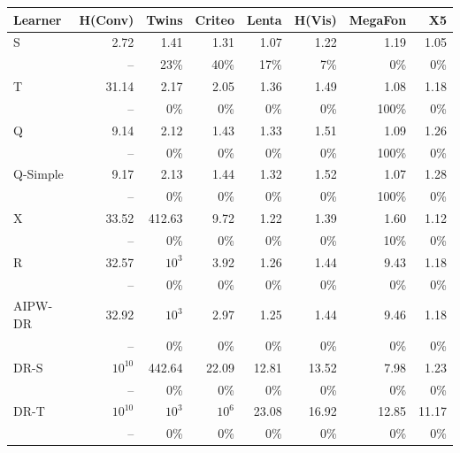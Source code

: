 \begin{tabular}{l|rrrrrrr}
\hline
Learner & H(Conv) & Twins & Criteo & Lenta & H(Vis) & MegaFon & X5 \\
\hline
S & 2.72 & 1.41 & 1.31 & 1.07 & 1.22 & 1.19 & 1.05 \\
 & \scriptsize -- & \scriptsize 23\% & \scriptsize 40\% & \scriptsize 17\% & \scriptsize 7\% & \scriptsize 0\% & \scriptsize 0\% \\[2pt]
T & 31.14 & 2.17 & 2.05 & 1.36 & 1.49 & 1.08 & 1.18 \\
 & \scriptsize -- & \scriptsize 0\% & \scriptsize 0\% & \scriptsize 0\% & \scriptsize 0\% & \scriptsize 100\% & \scriptsize 0\% \\[2pt]
\hline
Q & 9.14 & 2.12 & 1.43 & 1.33 & 1.51 & 1.09 & 1.26 \\
 & \scriptsize -- & \scriptsize 0\% & \scriptsize 0\% & \scriptsize 0\% & \scriptsize 0\% & \scriptsize 100\% & \scriptsize 0\% \\[2pt]
Q-Simple & 9.17 & 2.13 & 1.44 & 1.32 & 1.52 & 1.07 & 1.28 \\
 & \scriptsize -- & \scriptsize 0\% & \scriptsize 0\% & \scriptsize 0\% & \scriptsize 0\% & \scriptsize 100\% & \scriptsize 0\% \\[2pt]
\hline
X & 33.52 & 412.63 & 9.72 & 1.22 & 1.39 & 1.60 & 1.12 \\
 & \scriptsize -- & \scriptsize 0\% & \scriptsize 0\% & \scriptsize 0\% & \scriptsize 0\% & \scriptsize 10\% & \scriptsize 0\% \\[2pt]
R & 32.57 & $10^{3}$ & 3.92 & 1.26 & 1.44 & 9.43 & 1.18 \\
 & \scriptsize -- & \scriptsize 0\% & \scriptsize 0\% & \scriptsize 0\% & \scriptsize 0\% & \scriptsize 0\% & \scriptsize 0\% \\[2pt]
AIPW-DR & 32.92 & $10^{3}$ & 2.97 & 1.25 & 1.44 & 9.46 & 1.18 \\
 & \scriptsize -- & \scriptsize 0\% & \scriptsize 0\% & \scriptsize 0\% & \scriptsize 0\% & \scriptsize 0\% & \scriptsize 0\% \\[2pt]
\hline
DR-S & $10^{10}$ & 442.64 & 22.09 & 12.81 & 13.52 & 7.98 & 1.23 \\
 & \scriptsize -- & \scriptsize 0\% & \scriptsize 0\% & \scriptsize 0\% & \scriptsize 0\% & \scriptsize 0\% & \scriptsize 0\% \\[2pt]
DR-T & $10^{10}$ & $10^{3}$ & $10^{6}$ & 23.08 & 16.92 & 12.85 & 11.17 \\
 & \scriptsize -- & \scriptsize 0\% & \scriptsize 0\% & \scriptsize 0\% & \scriptsize 0\% & \scriptsize 0\% & \scriptsize 0\% \\[2pt]

\end{tabular}
